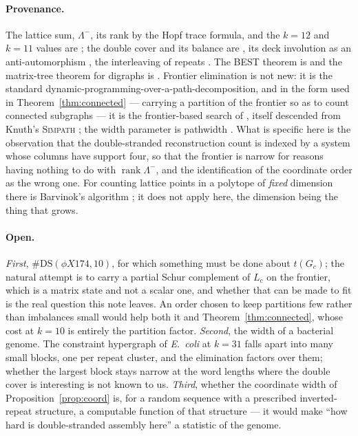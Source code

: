 \documentclass[11pt]{article}
\theoremstyle{plain}
\theoremstyle{definition}
\theoremstyle{remark}
\newcommand{\rank}{\operatorname{rank}}
\newcommand{\DS}{\mathrm{DS}}
\newcommand{\Lm}{\Lambda^{-}}
\begin{document}
\paragraph{Provenance.} The lattice sum, $\Lm$, its rank by the Hopf trace formula, and the
$k=12$ and $k=11$ values are \cite{Bio8}; the double cover and its balance are \cite{Bio6},
its deck involution as an anti-automorphism \cite{Bio7}, the interleaving of repeats
\cite{Bio1}. The BEST theorem is \cite{AEdB,SmithTutte} and the matrix-tree theorem for
digraphs is \cite{Tutte48}. Frontier elimination is not new: it is the standard
dynamic-programming-over-a-path-decomposition, and in the form used in
Theorem~\ref{thm:connected} --- carrying a partition of the frontier so as to count connected
subgraphs --- it is the frontier-based search of \cite{KIIM17}, itself descended from Knuth's
\textsc{Simpath} \cite{Knuth4A}; the width parameter is pathwidth \cite{Bodlaender98}. What is
specific here is the observation that the double-stranded reconstruction count is indexed by a
system whose columns have support four, so that the frontier is narrow for reasons having
nothing to do with $\rank\Lm$, and the identification of the coordinate order as the wrong one.
For counting lattice points in a polytope of \emph{fixed} dimension there is Barvinok's
algorithm \cite{Barvinok94}; it does not apply here, the dimension being the thing that grows.

\paragraph{Open.} \emph{First}, $\#\DS(\phi X174,10)$, for which something must be done about
$t(G_c)$; the natural attempt is to carry a partial Schur complement of $L_c$ on the frontier,
which is a matrix state and not a scalar one, and whether that can be made to fit is the real
question this note leaves. An order chosen to keep partitions few rather than imbalances small
would help both it and Theorem~\ref{thm:connected}, whose cost at $k=10$ is entirely the
partition factor. \emph{Second}, the width of a bacterial genome. The
constraint hypergraph of \emph{E.~coli} at $k=31$ falls apart into many small blocks, one per
repeat cluster, and the elimination factors over them; whether the largest block stays narrow
at the word lengths where the double cover is interesting is not known to us. \emph{Third},
whether the coordinate width of Proposition~\ref{prop:coord} is, for a random sequence with a
prescribed inverted-repeat structure, a computable function of that structure --- it would
make ``how hard is double-stranded assembly here'' a statistic of the genome.
\end{document}
